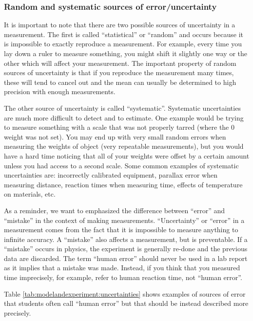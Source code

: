 \subsubsection{Random and systematic sources of error/uncertainty}
It is important to note that there are two possible sources of uncertainty in a measurement. The first is called ``statistical'' or ``random'' and occurs because it is impossible to exactly reproduce a measurement. For example, every time you lay down a ruler to measure something, you might shift it slightly one way or the other which will affect your measurement. The important property of random sources of uncertainty is that if you reproduce the measurement many times, these will tend to cancel out and the mean can usually be determined to high precision with enough measurements. 

The other source of uncertainty is called ``systematic''. Systematic uncertainties are much more difficult to detect and to estimate. One example would be trying to measure something with a scale that was not properly tarred (where the 0 weight was not set). You may end up with very small random errors when measuring the weights of object (very repeatable measurements), but you would have a hard time noticing that all of your weights were offset by a certain amount unless you had access to a second scale. Some common examples of systematic uncertainties are: incorrectly calibrated equipment, parallax error when measuring distance, reaction times when measuring time, effects of temperature on materials, etc.

As a reminder, we want to emphasized the difference between ``error'' and ``mistake'' in the context of making measurements. ``Uncertainty'' or ``error'' in a measurement comes from the fact that it is impossible to measure anything to infinite accuracy. A ``mistake'' also affects a measurement, but is preventable. If a ``mistake'' occurs in physics, the experiment is generally re-done and the previous data are discarded. The term ``human error'' should never be used in a lab report as it implies that a mistake was made. Instead, if you think that you measured time imprecisely, for example, refer to human reaction time, not ``human error''.

Table \ref{tab:modelandexperiment:uncertainties} shows examples of sources of error that students often call ``human error'' but that should be instead described more precisely.

